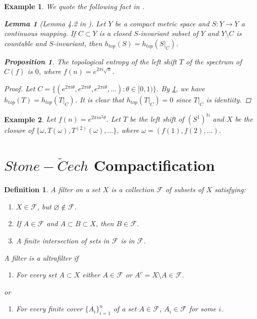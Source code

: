 \documentclass[a4paper,10pt]{amsart}
\newtheorem{example}{Example}[section]
\newtheorem{proposition}{Proposition}[section]
\newtheorem{definition}{Definition}[section]
\newtheorem{lemma}{Lemma}[section]
\newcommand{\FFF}{\mathcal F}
\newcommand{\N}{\mathbb N} %
\begin{document}
\begin{example}
We quote the following fact in \cite{JO}.

\begin{lemma}[Lemma 4.2 in \cite{JO}]\label{w_lam6}
Let $Y$ be a compact metric space and $S : Y \to Y$ a
continuous mapping. If $C \subset Y$ 
is a closed $S$-invariant subset of $Y$ and
$Y \setminus C$ is countable and $S$-invariant, 
then $h_{top}(S) = h_{top}(S|_{C})$.
\end{lemma}

\begin{proposition}
The topological entropy of the left shift $T$
of the spectrum of $C(f)$ is $0$, where $f(n) = e^{2\pi i \sqrt{n}}$. 
\end{proposition}

\begin{proof}
Let $C =\{(e^{2\pi i \theta}, e^{2\pi i \theta},
e^{2\pi i \theta}, \ldots ):\theta \in [0, 1) \}$.
By \cref{w_lam6}, we have $h_{top}(T) = h_{top}(T|_C)$.
It is clear that $h_{top}(T|_C) =0$ since $T|_C$ is identiity.
\end{proof}
\end{example}

\begin{example}
    Let $f(n) = e^{2\pi i n^2\theta}$. Let $T$ be the left shift of 
    $(S^{1})^{\N}$ and $X$ be the closure of $\{\omega, T(\omega),
    T^{(2)}(\omega), \ldots \}$, where 
    $\omega = (f(1), f(2), \ldots)$.
\end{example}

\section{$Stone-\breve{C}ech$ Compactification}

\begin{definition}
   A filter on a set $X$ is a collection $\FFF$ of subsets of $X$
   satisfying:
   \begin{enumerate}
       \item $X \in \FFF$, but $\varnothing \notin \FFF$.
       \item If $A \in \FFF$ and $A \subset B \subset X$, then 
           $B \in \FFF$.
       \item A finite intersection of sets in $\FFF$ is in $\FFF$.
   \end{enumerate}
   A filter is a ultrafilter if
   \begin{enumerate}[resume] 
       \item For every set $A \subset X$ either $A \in \FFF$
           or $A^{c} = X \setminus A \in \FFF$.  
   \end{enumerate}
   or
   \begin{enumerate}
    \item[(4)'] For every finite cover $\{A_{i}\}_{i=1}^{n}$ of a 
           set $A \in \FFF$, $A_{i} \in \FFF$ for some $i$.
   \end{enumerate}
\end{definition}
\end{document}
